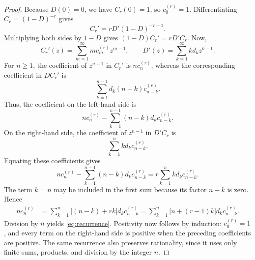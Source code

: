 \documentclass[11pt,reqno]{amsart}
\numberwithin{equation}{section}
\theoremstyle{definition}
\theoremstyle{remark}
\begin{document}
\begin{proof}
Because \(D(0)=0\), we have \(C_r(0)=1\), so
\(c_0^{(r)}=1\).  Differentiating \(C_r=(1-D)^{-r}\) gives
\[
 C_r'=rD'(1-D)^{-r-1}.
\]
Multiplying both sides by \(1-D\) gives
\(
 (1-D)C_r'=rD'C_r.
\)
Now,
\[
 C_r'(z)=\sum_{m=1}^{\infty}m c_m^{(r)}z^{m-1},
 \qquad
 D'(z)=\sum_{k=1}^{\infty}k d_kz^{k-1}.
\]
For \(n\geq1\), the coefficient of \(z^{n-1}\) in \(C_r'\) is
\(n c_n^{(r)}\), whereas the corresponding coefficient in \(DC_r'\)
is
\[
 \sum_{k=1}^{n-1}
 d_k(n-k)c_{n-k}^{(r)}.
\]
Thus, the coefficient on the left-hand side is
\[
 n c_n^{(r)}
 -
 \sum_{k=1}^{n-1}
 (n-k)d_kc_{n-k}^{(r)}.
\]
On the right-hand side, the coefficient of \(z^{n-1}\) in \(D'C_r\)
is
\[
 \sum_{k=1}^{n}
 k d_kc_{n-k}^{(r)}.
\]
Equating these coefficients gives
\[
 n c_n^{(r)}
 -
 \sum_{k=1}^{n-1}
 (n-k)d_kc_{n-k}^{(r)}
 =
 r\sum_{k=1}^{n}
 k d_kc_{n-k}^{(r)}.
\]
The term \(k=n\) may be included in the first sum because its factor
\(n-k\) is zero.  Hence
\[
 \begin{aligned}
 n c_n^{(r)}
 &=
 \sum_{k=1}^{n}
 \bigl[(n-k)+rk\bigr]d_kc_{n-k}^{(r)}=
 \sum_{k=1}^{n}
 \bigl[n+(r-1)k\bigr]d_kc_{n-k}^{(r)}.
 \end{aligned}
\]
Division by \(n\) yields \eqref{eq:recurrence}.  Positivity now follows
by induction: \(c_0^{(r)}=1\), and every term on the right-hand side is
positive when the preceding coefficients are positive.  The same
recurrence also preserves rationality, since it uses only finite sums,
products, and division by the integer \(n\).
\end{proof}
\end{document}
